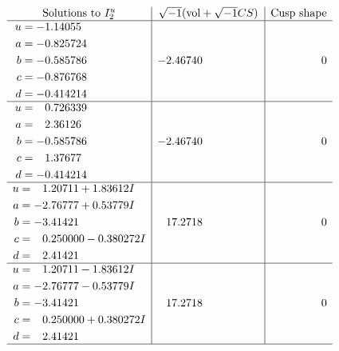 \documentclass[1p]{elsarticle_modified}
\theoremstyle{definition}
\newcommand{\I}{\sqrt{-1}}
\begin{document}
$$\begin{array}{c|c|c}  
\text{Solutions to }I^u_{2}& \I (\text{vol} + \sqrt{-1}CS) & \text{Cusp shape}\\
 \hline 
\begin{aligned}
u &= -1.14055\phantom{ +0.000000I} \\
a &= -0.825724\phantom{ +0.000000I} \\
b &= -0.585786\phantom{ +0.000000I} \\
c &= -0.876768\phantom{ +0.000000I} \\
d &= -0.414214\phantom{ +0.000000I}\end{aligned}
 & -2.46740\phantom{ +0.000000I} & \phantom{-0.000000 } 0 \\ \hline\begin{aligned}
u &= \phantom{-}0.726339\phantom{ +0.000000I} \\
a &= \phantom{-}2.36126\phantom{ +0.000000I} \\
b &= -0.585786\phantom{ +0.000000I} \\
c &= \phantom{-}1.37677\phantom{ +0.000000I} \\
d &= -0.414214\phantom{ +0.000000I}\end{aligned}
 & -2.46740\phantom{ +0.000000I} & \phantom{-0.000000 } 0 \\ \hline\begin{aligned}
u &= \phantom{-}1.20711 + 1.83612 I \\
a &= -2.76777 + 0.53779 I \\
b &= -3.41421\phantom{ +0.000000I} \\
c &= \phantom{-}0.250000 - 0.380272 I \\
d &= \phantom{-}2.41421\phantom{ +0.000000I}\end{aligned}
 & \phantom{-}17.2718\phantom{ +0.000000I} & \phantom{-0.000000 } 0 \\ \hline\begin{aligned}
u &= \phantom{-}1.20711 - 1.83612 I \\
a &= -2.76777 - 0.53779 I \\
b &= -3.41421\phantom{ +0.000000I} \\
c &= \phantom{-}0.250000 + 0.380272 I \\
d &= \phantom{-}2.41421\phantom{ +0.000000I}\end{aligned}
 & \phantom{-}17.2718\phantom{ +0.000000I} & \phantom{-0.000000 } 0\\
 \hline 
 \end{array}$$\newpage\newpage\renewcommand{\arraystretch}{1}
\end{document}
